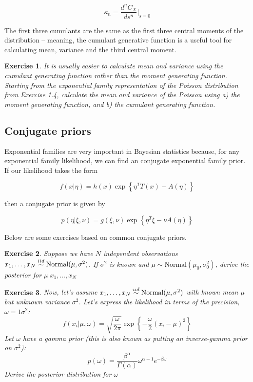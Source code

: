 \documentclass[twoside]{article}
\newcounter{lecnum}
\newtheorem{exercise}{Exercise}[lecnum]
\begin{document}
$$\kappa_n = \frac{d^nC_X}{ds^n}\Bigr|_{s=0}$$

The first three cumulants are the same as the first three central moments of the distribution -- meaning, the cumulant generative function is a useful tool for calculating mean, variance and the third central moment.

\begin{exercise}
  It is usually easier to calculate mean and variance using the cumulant generating function rather than the moment generating function. Starting from the exponential family representation of the Poisson distribution from Exercise 1.4, calculate the mean and variance of the Poisson using a) the moment generating function, and b) the cumulant generating function.
  \end{exercise}

\subsection{Conjugate priors}

Exponential families are very important in Bayesian statistics because, for any exponential family likelihood, we can find an conjugate exponential family prior. If our likelihood takes the form

$$f(x|\eta) = h(x)\exp\left\{\eta^TT(x) - A(\eta)\right\}$$

then a conjugate prior is given by

$$p(\eta|\xi,\nu) = g(\xi,\nu)\exp\left\{\eta^T\xi - \nu A(\eta)\right\}$$

Below are some exercises based on common conjugate priors.

\begin{exercise}
  Suppose we have $N$ independent observations $x_1,\dots, x_N \stackrel{\small{iid}}{\sim}\mbox{Normal}(\mu, \sigma^2)$. If $\sigma^2$ is known and $\mu\sim \mbox{Normal}(\mu_0,\sigma_0^2)$, derive the posterior for $\mu|x_1,\dots, x_N$
\end{exercise}

\begin{exercise}
  Now, let's assume  $x_1,\dots, x_N \stackrel{\small{iid}}{\sim}\mbox{Normal}(\mu, \sigma^2)$ with known mean $\mu$ but unknown variance $\sigma^2$. Let's express the likelihood in terms of the precision, $\omega=1\sigma^2$:
  $$f(x_i|\mu, \omega) = \sqrt{\frac{\omega}{2\pi}} \exp\left\{-\frac{\omega}{2}(x_i-\mu)^2\right\}$$
  Let $\omega$ have a gamma prior (this is also known as putting an inverse-gamma prior on $\sigma^2$):
  $$p(\omega) = \frac{\beta^\alpha}{\Gamma(\alpha)}\omega^{\alpha-1}e^{-\beta \omega}$$
  Derive the posterior distribution for $\omega$
\end{exercise}
\end{document}
